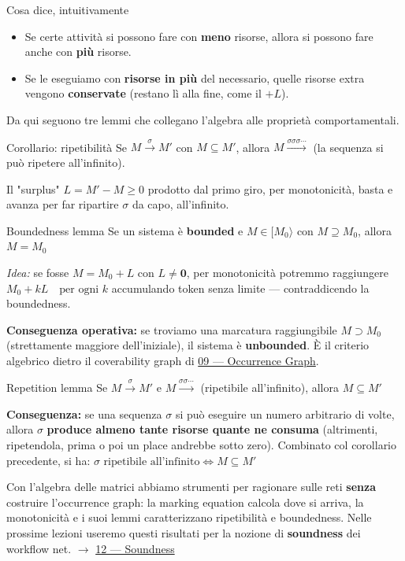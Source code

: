 \begin{boxtip}{Cosa dice, intuitivamente}
\begin{itemize}
\item Se certe attività si possono fare con \textbf{meno} risorse, allora si possono fare anche con \textbf{più} risorse.
\item Se le eseguiamo con \textbf{risorse in più} del necessario, quelle risorse extra vengono \textbf{conservate} (restano lì alla fine, come il $+L$).
\end{itemize}
\end{boxtip}

Da qui seguono tre lemmi che collegano l'algebra alle proprietà comportamentali.

\begin{boxtheorem}{Corollario: ripetibilità}
Se $M \xrightarrow{\sigma} M'$ con $M \subseteq M'$, allora \(M \xrightarrow{\sigma\sigma\sigma\cdots}\) (la sequenza si può ripetere all'infinito).

Il "surplus" \(L = M' - M \ge 0\) prodotto dal primo giro, per monotonicità, basta e avanza per far ripartire $\sigma$ da capo, all'infinito.
\end{boxtheorem}

\begin{boxtheorem}{Boundedness lemma}
Se un sistema è \textbf{bounded} e $M \in [M_0\rangle$ con $M \supseteq M_0$, allora \(M = M_0\)

\emph{Idea:} se fosse $M = M_0 + L$ con $L \ne \mathbf{0}$, per monotonicità potremmo raggiungere \(M_0 + kL \quad \text{per ogni } k\) accumulando token senza limite — contraddicendo la boundedness.

\textbf{Conseguenza operativa:} se troviamo una marcatura raggiungibile $M \supset M_0$ (strettamente maggiore dell'iniziale), il sistema è \textbf{unbounded}. È il criterio algebrico dietro il coverability graph di \hyperref[ch:09]{09 — Occurrence Graph}.
\end{boxtheorem}

\begin{boxtheorem}{Repetition lemma}
Se $M \xrightarrow{\sigma} M'$ e $M \xrightarrow{\sigma\sigma\cdots}$ (ripetibile all'infinito), allora \(M \subseteq M'\)

\textbf{Conseguenza:} se una sequenza $\sigma$ si può eseguire un numero arbitrario di volte, allora $\sigma$ \textbf{produce almeno tante risorse quante ne consuma} (altrimenti, ripetendola, prima o poi un place andrebbe sotto zero). Combinato col corollario precedente, si ha: \(\sigma \text{ ripetibile all'infinito} \iff M \subseteq M'\)
\end{boxtheorem}

Con l'algebra delle matrici abbiamo strumenti per ragionare sulle reti \textbf{senza} costruire l'occurrence graph: la marking equation calcola dove si arriva, la monotonicità e i suoi lemmi caratterizzano ripetibilità e boundedness. Nelle prossime lezioni useremo questi risultati per la nozione di \textbf{soundness} dei workflow net. $\rightarrow$ \hyperref[ch:12]{12 — Soundness}